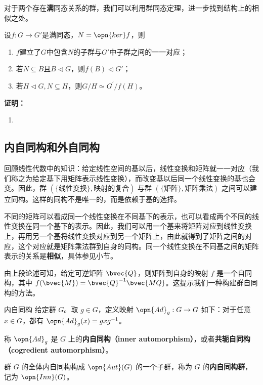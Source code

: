 对于两个存在\textbf{满}同态关系的群，我们可以利用群同态定理，进一步找到结构上的相似之处。
\begin{theorem}{}
设$f:G\to G'$是满同态，$N=\opn{ker}f$，则
\begin{enumerate}
\item $f$建立了$G$中包含$N$的子群与$G'$中子群之间的一一对应；
\item 若$N\subseteq B$且$B\lhd G$，则$f(B)\lhd G'$；
\item 若$H\lhd G,N\subseteq H$，则$G/H\simeq G^{\prime}/f(H)$。
\end{enumerate}
\end{theorem}
\textbf{证明：}
\begin{enumerate}
\item 
\end{enumerate}


\subsection{内自同构和外自同构}



回顾线性代数中的知识：给定线性空间的基以后，线性变换和矩阵就一一对应（我们称之为给定基下用矩阵表示线性变换），而改变基以后同一个线性变换的基也会变。因此，群 $(\{\text{线性变换}\}, \text{映射的复合})$ 与群 $(\{\text{矩阵}\}, \text{矩阵乘法})$ 之间可以建立同构。这样的同构不是唯一的，而是依赖于基的选择。

不同的矩阵可以看成同一个线性变换在不同基下的表示，也可以看成两个不同的线性变换在同一个基下的表示。因此，我们可以用一个基来将矩阵对应到线性变换上，再用另一个基将线性变换对应到另一个矩阵上，由此就得到了矩阵之间的对应，这个对应就是矩阵乘法群到自身的同构。同一个线性变换在不同基之间的矩阵表示的关系是\textbf{相似}，具体参见小节。

由上段论述可知，给定可逆矩阵 $\bvec{Q}$，则矩阵到自身的映射 $f$ 是一个自同构，其中 $f(\bvec{M})=\bvec{Q}^{-1}\bvec{MQ}$。这提示我们一种构建群自同构的方法。

\begin{definition}{内自同构}
给定群 $G$。取 $g\in G$，定义映射 $\opn{Ad}_g:G\to G$ 如下：对于任意 $x\in G$，都有 $\opn{Ad}_g(x)=gxg^{-1}$。

称 $\opn{Ad}_g$ 是 $G$ 上的\textbf{内自同构（inner automorphism）}，或者\textbf{共轭自同构（cogredient automorphism）}。


群 $G$ 的全体内自同构构成 $\opn{Aut}(G)$ 的一个子群，称为 $G$ 的\textbf{内自同构群}， 记为 $\opn{Inn}(G)$。

\end{definition}


